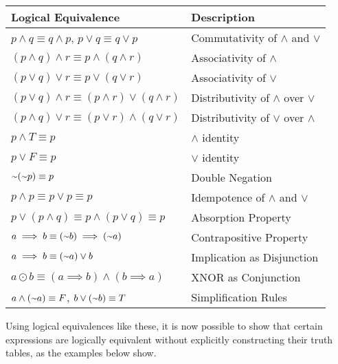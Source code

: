 \begin{table}[h]
\centering
\begin{tabular}{|l|l|}
\hline
Logical Equivalence & Description \\ \hline
$p \land q \equiv q \land p$, $p \lor q \equiv q \lor p$ & Commutativity of $\land$ and $\lor$\\ \hline
$(p \land q) \land r \equiv p \land (q \land r)$ & Associativity of $\land$\\ \hline
$(p \lor q) \lor r \equiv p \lor (q \lor r)$ & Associativity of $\lor$ \\ \hline
$(p \lor q) \land r \equiv (p \land r) \lor (q \land r) $ & Distributivity of $\land$ over $\lor$ \\ \hline
$(p \land q) \lor r \equiv (p \lor r) \land (q \lor r) $ & Distributivity of $\lor$ over $\land$ \\ \hline
$p \land T \equiv p$ & $\land$ identity \\ \hline
$p \lor F \equiv p$ & $\lor$ identity \\ \hline
$\shortsim(\shortsim p) \equiv p$ & Double Negation \\ \hline
$p \land p \equiv p \lor p \equiv p$ & Idempotence of $\land$ and $\lor$ \\ \hline
$p \lor (p \land q) \equiv p \land (p \lor q) \equiv p$ & Absorption Property \\ \hline
$a \implies b \equiv (\shortsim b) \implies (\shortsim a)$ & Contrapositive Property \\ \hline
$a \implies b \equiv (\shortsim a) \lor b$ & Implication as Disjunction \\ \hline
$a \odot b \equiv (a \implies b) \land (b \implies a)$ & XNOR as Conjunction \\ \hline
$a \land (\shortsim a) \equiv F$, $b \lor (\shortsim b) \equiv T$ & Simplification Rules \\ \hline
\end{tabular}
\end{table}

Using logical equivalences like these, it is now possible to show that certain expressions are logically equivalent without explicitly constructing their truth tables, as the examples below show.

